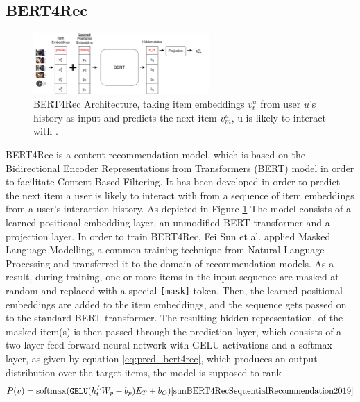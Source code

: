 \documentclass{Academic}
\begin{document}
        \subsection{BERT4Rec}
        \begin{figure}[ht!]
            \centering
            \includegraphics[width=0.6\textwidth]{images/BERT4Rec.pdf}
            \caption{BERT4Rec Architecture, taking item embeddings $v_t^u$ from user $u$'s history as input and predicts the next item $v_m^u$, u is likely to interact with \cite{sunBERT4RecSequentialRecommendation2019}.}
            \label{fig:bert4rec}
        \end{figure}
        BERT4Rec is a content recommendation model, which is based on the Bidirectional Encoder Representations from Transformers (BERT) model in order to facilitate Content Based Filtering. It has been developed in order to predict the next item a user is likely to interact with from a sequence of item embeddings from a user's interaction history. As depicted in Figure \ref{fig:bert4rec} The model consists of a learned positional embedding layer, an unmodified BERT transformer and a projection layer. In order to train BERT4Rec, Fei Sun et al. \cite{sunBERT4RecSequentialRecommendation2019} applied Masked Language Modelling, a common training technique from Natural Language Processing and transferred it to the domain of recommendation models. As a result, during training, one or more items in the input sequence are masked at random and replaced with a special \texttt{[mask]} token. Then, the learned positional embeddings are added to the item embeddings, and the sequence gets passed on to the standard BERT transformer. The resulting hidden representation, of the masked item(s) is then passed through the prediction layer, which consists of a two layer feed forward neural network with GELU activations and a softmax layer, as given by equation \ref{eq:pred_bert4rec}, which produces an output distribution over the target items, the model is supposed to rank
        \begin{equation}\label{eq:pred_bert4rec}
            P(v) = \mathrm{softmax}(\texttt{GELU}(h_t^LW_p+b_p)E_T + b_O) \text{\cite{sunBERT4RecSequentialRecommendation2019}}
        \end{equation}
\end{document}
